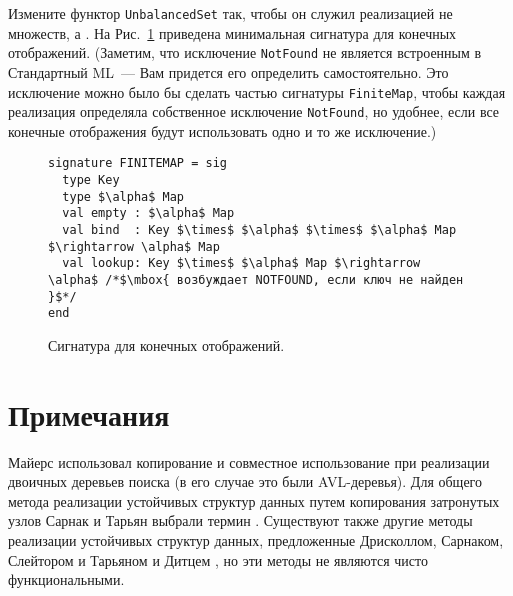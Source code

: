 \begin{exercise}\label{ex:2.6}
  Измените функтор \lstinline!UnbalancedSet! так, чтобы он служил
  реализацией не множеств, а . На
  Рис.~\ref{fig:2.10} приведена минимальная сигнатура для конечных
  отображений. (Заметим, что исключение \lstinline!NotFound! не
  является встроенным в Стандартный ML~--- Вам придется его определить
  самостоятельно. Это исключение можно было бы сделать частью
  сигнатуры \lstinline!FiniteMap!,  чтобы каждая реализация
  определяла собственное исключение \lstinline!NotFound!, но удобнее,
  если все конечные отображения будут использовать одно и то же
  исключение.)
\end{exercise}

\begin{figure}
\begin{lstlisting}
signature FINITEMAP = sig
  type Key
  type $\alpha$ Map
  val empty : $\alpha$ Map
  val bind  : Key $\times$ $\alpha$ $\times$ $\alpha$ Map $\rightarrow \alpha$ Map
  val lookup: Key $\times$ $\alpha$ Map $\rightarrow \alpha$ /*$\mbox{ возбуждает NOTFOUND, если ключ не найден }$*/
end
\end{lstlisting}
  \caption{Сигнатура для конечных отображений.}
  \label{fig:2.10}
\end{figure}

\section{Примечания}
\label{sc:2.3}

Майерс \cite{Myers1982,Myers1984} использовал копирование и совместное использование
при реализации двоичных деревьев поиска (в его случае это были
AVL-деревья).  Для общего метода реализации устойчивых структур данных
путем копирования затронутых узлов
Сарнак и Тарьян \cite{SarnakTarjan1986a} выбрали термин
. Существуют также другие методы
реализации устойчивых структур данных, предложенные Дрисколлом,
Сарнаком, Слейтором и Тарьяном \cite{Driscoll-etal1989} и Дитцем
\cite{Dietz1989}, но эти методы не являются чисто функциональными.

